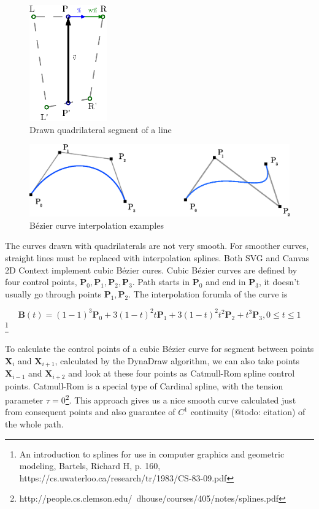    
  \begin{figure}
  	\centering
      \includegraphics[height=50mm]{../img/draw-segment-quadrilateral.eps}
      \caption{Drawn quadrilateral segment of a line}
      \label{fig:draw-segment-quadrilateral}
  \end{figure}


\begin{figure}
	\centering
  		\includegraphics[width=130mm]{../img/bezier_curves.eps}
  		\caption{Bézier curve interpolation examples}
  		\label{fig:bezier-curve}
\end{figure}

The curves drawn with quadrilaterals are not very smooth. For smoother curves, straight lines must be replaced with interpolation splines. Both SVG and Canvas 2D Context implement cubic Bézier cures. Cubic Bézier curves are defined by four control points, $ \mathbf{P}_0, \mathbf{P}_1, \mathbf{P}_2, \mathbf{P}_3 $. Path starts in $ \mathbf{P}_0 $ and end in $ \mathbf{P}_3 $, it doesn't usually go through points $ \mathbf{P}_1, \mathbf{P}_2 $. The interpolation forumla of the curve is

$$ \mathbf{B}(t) = (1 - 1)^3 \mathbf{P}_0 + 3(1-t)^{2}t\mathbf{P}_1 + 3(1-t)^{2}t^2\mathbf{P}_2 + t^3\mathbf{P}_3, 0 \leq t \leq 1$$ \cite{}\footnote{An introduction to splines for use in computer graphics and geometric modeling, Bartels, Richard H, p. 160, https://cs.uwaterloo.ca/research/tr/1983/CS-83-09.pdf}

To calculate the control points of a cubic Bézier curve for segment between points $\mathbf{X}_i$ and $\mathbf{X}_{i+1}$, calculated by the DynaDraw algorithm, we can also take points $\mathbf{X}_{i-1}$ and $\mathbf{X}_{i+2}$ and look at these four points as Catmull-Rom spline control points. Catmull-Rom is a special type of Cardinal spline, with the tension parameter $\tau = 0$\cite{}\footnote{http://people.cs.clemson.edu/~dhouse/courses/405/notes/splines.pdf}. This approach gives us a nice smooth curve calculated just from consequent points and also guarantee of $C^1$ continuity (@todo: citation) of the whole path.

